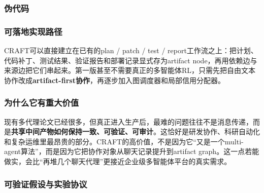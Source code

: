 \documentclass[12pt,a4paper]{article}
\newenvironment{algorithmic}[1][]%
      {\begin{list}{}{\leftmargin=2em\itemsep=0.2em\parsep=0pt\topsep=0.2em}}%
      {\end{list}}
\newcommand{\STATE}{\item[]}
\newcommand{\FOR}[1]{\item[]\textbf{for} ##1 \textbf{do}}
\newcommand{\ENDFOR}{\item[]\textbf{end for}}
\newcommand{\IF}[1]{\item[]\textbf{if} ##1 \textbf{then}}
\newcommand{\ELSE}{\item[]\textbf{else}}
\newcommand{\ENDIF}{\item[]\textbf{end if}}
\newcommand{\REQUIRE}{\item[]\textbf{Input: }}
\newcommand{\RETURN}{\item[]\textbf{return} }
\begin{document}
\subsubsection{伪代码}


\subsubsection{可落地实现路径}

CRAFT可以直接建立在已有的plan / patch / test / report工作流之上：把计划、代码补丁、测试结果、验证报告和部署记录显式存为artifact node，再用依赖边与来源边把它们串起来。第一版甚至不需要真正的多智能体RL，只需先把自由文本协作改成\textbf{artifact-first协作}，再逐步加入图调度器和局部信用分配器。

\subsubsection{为什么它有重大价值}

现有多代理论文已经很多，但真正进入生产后，最难的问题往往不是消息传递，而是\textbf{共享中间产物如何保持一致、可验证、可审计}。这恰好是研发协作、科研自动化和复杂运维里最昂贵的部分。CRAFT的高价值，不是因为它“又是一个multi-agent算法”，而是因为它把协作对象从聊天记录提升到artifact graph。这一点若能做实，会比“再堆几个聊天代理”更接近企业级多智能体平台的真实需求。

\subsubsection{可验证假设与实验协议}
\end{document}

